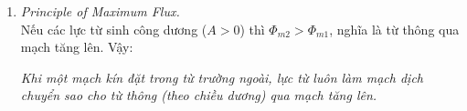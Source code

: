 \begin{enumerate}
\begin{remark}
Kết quả này không mâu thuẫn với nhận xét ``lực từ không sinh công'' ở đầu chương. Lực Lorentz $q\vec{v} \times \vec{B}$ tác dụng lên từng điện tích luôn vuông góc với vận tốc toàn phần của nó nên không sinh công. Khi dây dẫn chuyển động, lực từ chỉ ``chuyển hướng'' năng lượng: công $I\,d\Phi_m$ thực hiện lên dây được bù đúng bằng công mà nguồn điện phải cung cấp để duy trì dòng $I$ chống lại suất điện động cảm ứng xuất hiện trong mạch (xem phần cảm ứng điện từ bên dưới). Đây chính là câu trả lời cho câu hỏi ``cái gì đã thực hiện công?''.
\end{remark}

\item \textit{Principle of Maximum Flux.}\\
Nếu các lực từ sinh công dương ($A > 0$) thì $\Phi_{m2} > \Phi_{m1}$, nghĩa là từ thông qua mạch tăng lên. Vậy:
\begin{center}
\textit{Khi một mạch kín đặt trong từ trường ngoài, lực từ luôn làm mạch dịch chuyển sao cho từ thông (theo chiều dương) qua mạch tăng lên.}
\end{center}
\end{enumerate}

